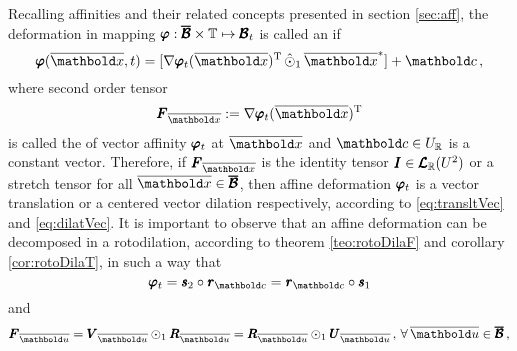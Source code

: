 Recalling affinities and their related concepts presented in section \ref{sec:aff}, the deformation in mapping $\pmb{\varphi} : \pmb{\overline{\mathcal{B}}}\times\mathbb{T} \mapsto \pmb{\mathcal{B}}_t$ is called an  if  
\begin{equation}\label{eq:affDeform}
\fua{\tnr{\varphi}}{\overline{\vto{x}},t} =[\fua{\nabla\tnr{\varphi}_t}{\overline{\vto{x}}}^\text{T}\,\hat{\odot}_1\,\overline{\vto{x}}^*] + \vto{c}\,, 
\end{equation}
where second order tensor 
\begin{equation}
\tnr{F}_{\overline{\vto{x}}}:=\fua{\nabla\tnr{\varphi}_t}{\overline{\vto{x}}}^\text{T}
\end{equation}
is called the  of vector affinity $\pmb{\varphi}_t$ at $\overline{\vto{x}}$ and $\vto{c}\in U_\real$ is a constant vector. Therefore, if $\tnr{F}_{\overline{\vto{x}}}$ is the identity tensor $\pmb{I}\in\pmb{\mathcal{L}}_{\mathbb{R}}(U^{2})$ or a stretch tensor for all $\overline{\vto{x}}\in\tnr{\overline{\mathcal{B}}}$, then affine deformation $\pmb{\varphi}_t$ is a vector translation or a centered vector dilation respectively, according to \eqref{eq:transltVec} and \eqref{eq:dilatVec}. It is important to observe that an affine deformation can be decomposed in a rotodilation, according to theorem \ref{teo:rotoDilaF} and corollary \ref{cor:rotoDilaT}, in such a way that 
\begin{equation}\label{eq:decompDefGrad}
\tnr{\varphi}_t = \tnr{\mathit{s}}_2\circ\tnr{\mathit{r}}_{\vto{c}} = \tnr{\mathit{r}}_{\vto{c}}\circ\tnr{\mathit{s}}_1
\end{equation}
and
\begin{equation}
\tnr{F}_{\overline{\vto{u}}}=\tnr{V}_{\overline{\vto{u}}}\odot_1\tnr{R}_{\overline{\vto{u}}}=\tnr{R}_{\overline{\vto{u}}}\odot_1\tnr{U}_{\overline{\vto{u}}}\,,\,\forall\, \overline{\vto{u}}\in\tnr{\overline{\mathcal{B}}}\,, 
\end{equation}
